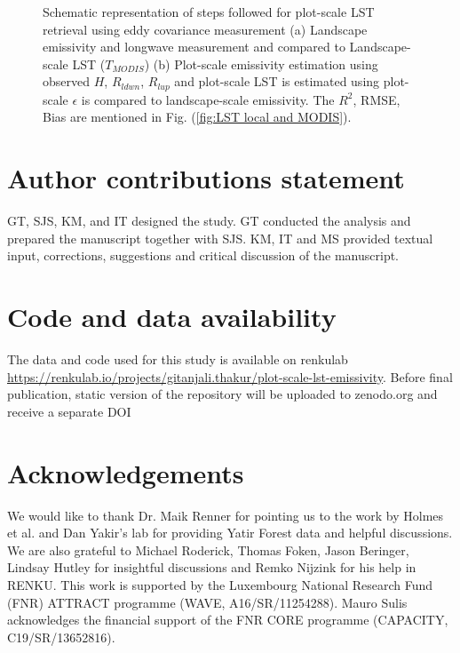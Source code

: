 \documentclass[fleqn,10pt]{wlscirep}
\begin{document}
{{\begin{figure}[h!]
\begin{subfigure}{.5\textwidth}
{}
\end{subfigure}
\caption{Schematic representation of steps followed for plot-scale LST retrieval using eddy covariance measurement (a) Landscape emissivity and longwave measurement and compared to Landscape-scale LST ($T_{MODIS}$) (b) Plot-scale emissivity estimation using observed $H$, $R_{ldwn}$, $R_{lup}$ and plot-scale LST is estimated using plot-scale $\epsilon$ is compared to landscape-scale emissivity. The $R^{2}$, RMSE, Bias are mentioned in Fig. (\ref{fig:LST local and MODIS}).}
\label{fig:flow_chart}
\end{figure}

\section{Author contributions statement}
GT, SJS, KM, and IT designed the study. GT conducted the analysis and prepared the manuscript together with SJS. KM, IT and MS provided textual input, corrections, suggestions and critical discussion of the manuscript.

\section{Code and data availability}
The data and code used for this study is available on renkulab \url{https://renkulab.io/projects/gitanjali.thakur/plot-scale-lst-emissivity}. Before final publication, static version of the repository will be uploaded to zenodo.org and receive a separate DOI

\section{Acknowledgements}
We would like to thank Dr. Maik Renner for pointing us to the work by Holmes et al. and Dan Yakir's lab for providing Yatir Forest data and helpful discussions. We are also grateful to Michael Roderick, Thomas Foken, Jason Beringer, Lindsay Hutley for insightful discussions and Remko Nijzink for his help in RENKU. This work is supported by the Luxembourg National Research Fund (FNR) ATTRACT programme (WAVE, A16/SR/11254288). Mauro Sulis acknowledges the financial support of the FNR CORE programme (CAPACITY, C19/SR/13652816).

}}
\end{document}
